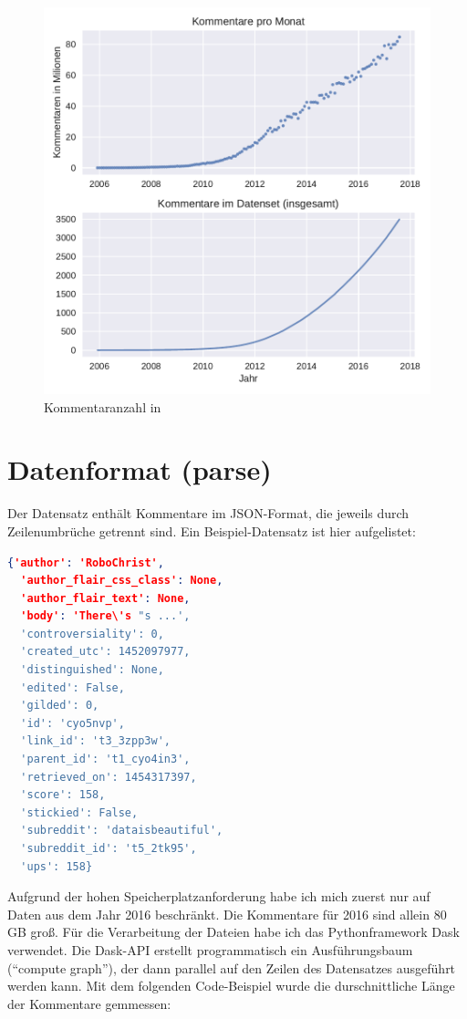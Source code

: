 \documentclass[nobib, nohyper, a4paper,openany]{tufte-book}
\begin{document}
\begin{figure}
  \label{fig:monthly}
  \caption{Kommentaranzahl in \cite{BaumgartnerRedditData2017}}  
    \includegraphics[width=\textwidth]{figures/monthlyCount.pdf}  
  \end{figure}



\section{Datenformat (parse)}
Der Datensatz enthält  Kommentare im JSON-Format, die jeweils durch Zeilenumbrüche getrennt sind. 
Ein Beispiel-Datensatz ist hier aufgelistet:

\begin{lstlisting}[language=json,firstnumber=1,label=codejson]
  {'author': 'RoboChrist',
  'author_flair_css_class': None,
  'author_flair_text': None,
  'body': 'There\'s "s ...',
  'controversiality': 0,
  'created_utc': 1452097977,
  'distinguished': None,
  'edited': False,
  'gilded': 0,
  'id': 'cyo5nvp',
  'link_id': 't3_3zpp3w',
  'parent_id': 't1_cyo4in3',
  'retrieved_on': 1454317397,
  'score': 158,
  'stickied': False,
  'subreddit': 'dataisbeautiful',
  'subreddit_id': 't5_2tk95',
  'ups': 158}
\end{lstlisting}

Aufgrund der hohen Speicherplatzanforderung habe ich mich zuerst nur auf Daten aus dem Jahr 2016 beschränkt. Die Kommentare für 2016 sind allein 80 GB groß.
Für die Verarbeitung der Dateien habe ich das Pythonframework Dask \cite{RocklindaskParallelcomputing2017} verwendet.
Die Dask-API erstellt programmatisch ein Ausführungsbaum (``compute graph''),
der dann parallel auf den Zeilen des Datensatzes ausgeführt werden kann.
Mit dem folgenden Code-Beispiel wurde die durschnittliche Länge der Kommentare gemmessen: 
\end{document}
